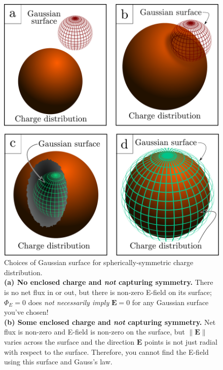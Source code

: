 \documentclass[10pt,letterpaper,twoside]{article}
\begin{document}
\begin{figure}[htb]
  \centering
  \vspace{5pt} 
  \vspace{10pt}
	\centering
	\includegraphics[keepaspectratio=true,width=1.0\columnwidth]{./spherical_gaussian_surfaces.pdf}
	\caption{Choices of Gaussian surface for spherically-symmetric charge distribution.\\
	\textbf{(a) No enclosed charge and \textit{not} capturing symmetry.}
	There is no net flux in or out, but there is non-zero E-field on its surface; $\Phi_E=0$ does \textit{not necessarily imply} $\bm E=0$ for any Gaussian surface you've chosen!\\
	\textbf{(b) Some enclosed charge and \textit{not} capturing symmetry.}
	Net flux is non-zero and E-field is non-zero on the surface, but $\|\bm E\|$ varies across the surface and the direction $\bm E$ points is not just radial with respect to the surface.
	Therefore, you cannot find the E-field using this surface and Gauss's law.\\
}
\end{figure}
\end{document}
